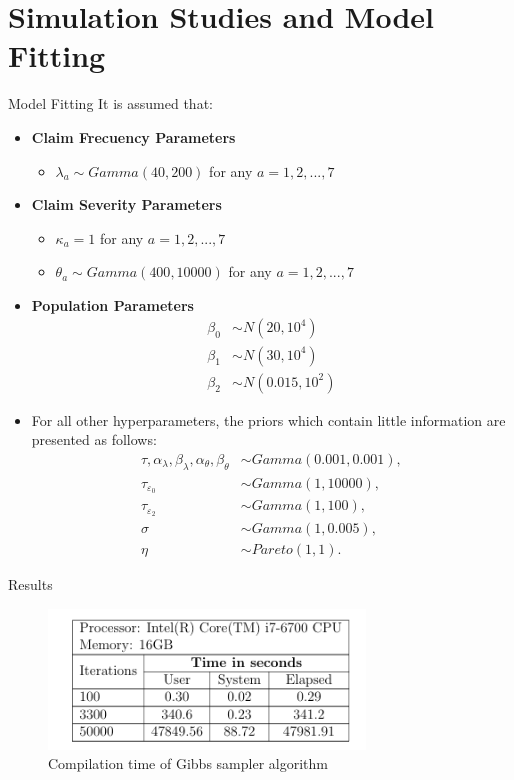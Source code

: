 \documentclass[10pt]{beamer} %
\begin{document}
\section{Simulation Studies and Model Fitting}
\begin{frame}{Model Fitting}
    It is assumed that: \\
\begin{itemize}
	\item \textbf{Claim Frecuency Parameters}
	\begin{itemize}
		\item $\lambda_{a}\sim Gamma(40,200)$ for any $a=1,2,...,7$
	\end{itemize}
	\item \textbf{Claim Severity Parameters}
	\begin{itemize}
		\item $\kappa_{a}=1$ for any $a=1,2,...,7$
		\item $\theta_{a}\sim Gamma(400,10000)$ for any $a=1,2,...,7$ 
	\end{itemize}
	\item \textbf{Population Parameters}
\begin{align*}
    \beta_0&\sim N(20, 10^4)\\
    \beta_1&\sim N(30, 10^4)\\
    \beta_2&\sim N(0.015, 10^2)
\end{align*}
\item For all other hyperparameters, the priors which contain little information are presented as follows:
\begin{align*}
    \tau,\alpha_\lambda,\beta_\lambda,\alpha_\theta,\beta_\theta&\sim Gamma(0.001,0.001),\\
    \tau_{\varepsilon_0}&\sim Gamma(1,10000),\\
    \tau_{\varepsilon_2}&\sim Gamma(1,100),\\
    \sigma&\sim Gamma(1,0.005),\\
    \eta&\sim Pareto(1,1).
\end{align*}
\end{itemize}

\end{frame}

\begin{frame}{Results}
\begin{figure}
    \centering
    \includegraphics[width=0.75\textwidth]{Tab1.png}
    \caption{Compilation time of Gibbs sampler algorithm}
    \label{fig:TAB1}
\end{figure}
\end{frame}
\end{document}
